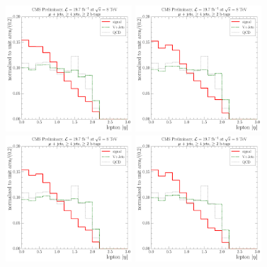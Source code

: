 \begin{figure}[!htbp]
	\centering
	\vspace*{-0.5cm}
	\hspace*{\fill}
  	{\includegraphics[width=0.42\textwidth]{measurement/MET/central/fit_templates/muon_templates_bin_0-25}}\hfill
  	{\includegraphics[width=0.42\textwidth]{measurement/MET/central/fit_templates/muon_templates_bin_25-45}}
  	\hspace*{\fill} \\
  	\hspace*{\fill}
  	{\includegraphics[width=0.42\textwidth]{measurement/MET/central/fit_templates/muon_templates_bin_45-70}}\hfill
  	{\includegraphics[width=0.42\textwidth]{measurement/MET/central/fit_templates/muon_templates_bin_70-100}}

\end{figure}

